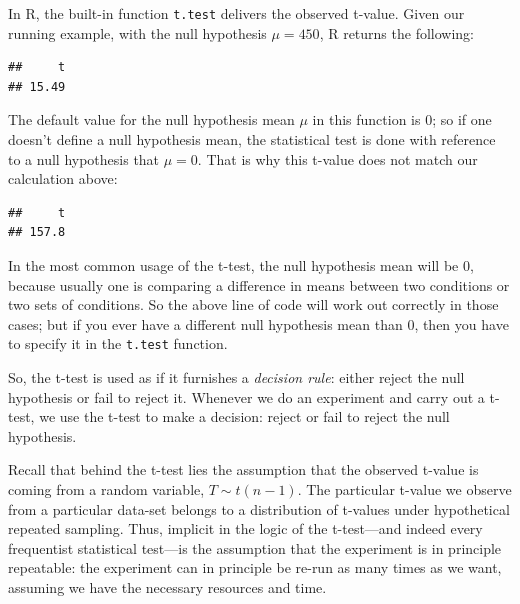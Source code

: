 \documentclass[12pt,]{krantz}
\newenvironment{Shaded}{\begin{snugshade}}{\end{snugshade}}
\newcommand{\CommentTok}[1]{\textcolor[rgb]{0.56,0.35,0.01}{\textit{#1}}}
\newcommand{\DataTypeTok}[1]{\textcolor[rgb]{0.13,0.29,0.53}{#1}}
\newcommand{\DecValTok}[1]{\textcolor[rgb]{0.00,0.00,0.81}{#1}}
\newcommand{\KeywordTok}[1]{\textcolor[rgb]{0.13,0.29,0.53}{\textbf{#1}}}
\newcommand{\NormalTok}[1]{#1}
\newcommand{\OperatorTok}[1]{\textcolor[rgb]{0.81,0.36,0.00}{\textbf{#1}}}
\begin{document}
In R, the built-in function \texttt{t.test} delivers the observed t-value. Given our running example, with the null hypothesis \(\mu=450\), R returns the following:

\begin{Shaded}
\end{Shaded}

\begin{verbatim}
##     t 
## 15.49
\end{verbatim}

The default value for the null hypothesis mean \(\mu\) in this function is 0; so if one doesn't define a null hypothesis mean, the statistical test is done with reference to a null hypothesis that \(\mu=0\). That is why this t-value does not match our calculation above:

\begin{Shaded}
\end{Shaded}

\begin{verbatim}
##     t 
## 157.8
\end{verbatim}

In the most common usage of the t-test, the null hypothesis mean will be \(0\), because usually one is comparing a difference in means between two conditions or two sets of conditions. So the above line of code will work out correctly in those cases; but if you ever have a different null hypothesis mean than \(0\), then you have to specify it in the \texttt{t.test} function.

So, the t-test is used as if it furnishes a \emph{decision rule}: either reject the null hypothesis or fail to reject it. Whenever we do an experiment and carry out a t-test, we use the t-test to make a decision: reject or fail to reject the null hypothesis.

Recall that behind the t-test lies the assumption that the observed t-value is coming from a random variable, \(T\sim t(n-1)\). The particular t-value we observe from a particular data-set belongs to a distribution of t-values under hypothetical repeated sampling. Thus, implicit in the logic of the t-test---and indeed every frequentist statistical test---is the assumption that the experiment is in principle repeatable: the experiment can in principle be re-run as many times as we want, assuming we have the necessary resources and time.
\end{document}
